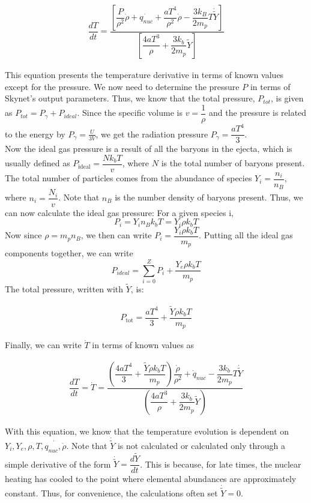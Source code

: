 \documentclass[11pt,a4paper]{article}
\begin{document}
\begin{align}
	\dfrac{dT}{dt} = \dfrac{[ \dfrac{P}{\rho^2} \dot{\rho} + \dot{q_{nuc}} + \dfrac{aT^4}{\rho^2} \dot{\rho} - \dfrac{3 k_B}{2 m_p} T \dot{\tilde{Y}}]} {[\dfrac{4a T^3}{\rho} + \dfrac{3 k_b}{2 m_p} \tilde{Y}]}
\end{align}

This equation presents the temperature derivative in terms of known values except for the pressure. We now need to determine the pressure $P$ in terms of Skynet's output parameters. Thus, we know that the total pressure, $P_{tot}$, is given as $P_{tot} = P_{\gamma} + P_{ideal}$. Since the specific volume is $v = \dfrac{1}{\rho}$ and the pressure is related to the energy by $P_\gamma = \frac{U}{3V}$,  we get the radiation pressure $P_{\gamma} = \dfrac{a T^4}{3}$.\\
Now the ideal gas pressure is a result of all the baryons in the ejecta, which is usually defined as $P_\mathrm{ideal} = \dfrac{N k_b T}{v}$, where $N$ is the total number of baryons present. The total number of particles comes from the abundance of species $Y_i = \dfrac{n_i}{n_B}$, where $n_i = \dfrac{N_i}{v}$. Note that $n_B$ is the number density of baryons present. Thus, we can now calculate the ideal gas pressure: For a given species i,
$$ P_i = Y_i n_B k_b T  = Y_i \rho k_b T$$ Now since $\rho = m_p n_B$, we then can write $P_i = \dfrac{Y_i \rho k_b T}{m_p}$. Putting all the ideal gas components together, we can write 
$$ P_{ideal} = \sum_{i=0}^{Z} P_i + \dfrac{Y_e \rho k_b T}{m_p} $$ The total pressure, written with $\tilde{Y}$, is:

\begin{align}
	P_\mathrm{tot} = \dfrac{a T^4}{3} + \dfrac{\tilde{Y} \rho k_b T}{m_p}
\end{align} 

Finally, we can write $\dot{T}$ in terms of known values as 

\begin{align}
	\dfrac{dT}{dt} = \dot{T} = \dfrac{ \left(\dfrac{4 a T^4}{3} + \dfrac{\tilde{Y} \rho k_b T}{m_p} \right) \dfrac{\dot{\rho}}{\rho ^2} + \dot{q}_{nuc} - \dfrac{3 k_b}{2 m_p} T \dot{\tilde{Y}}} { \left( \dfrac{4a T^3}{\rho}  + \dfrac{3 k_b}{2 m_p} \tilde{Y} \right)}
\end{align}

With this equation, we know that the temperature evolution is dependent on $Y_i, Y_e, \rho, T, \dot{q_{nuc}, \dot{\rho}}$. Note that $\dot{\tilde{Y}}$ is not calculated or calculated only through a simple derivative of the form $\dot{\tilde{Y}} = \dfrac{d \tilde{Y}} {dt} $. This is because, for late times, the nuclear heating has cooled to the point where elemental abundances are approximately constant. Thus, for convenience, the calculations often set $\dot{\tilde{Y}} = 0$. \\
\end{document}
